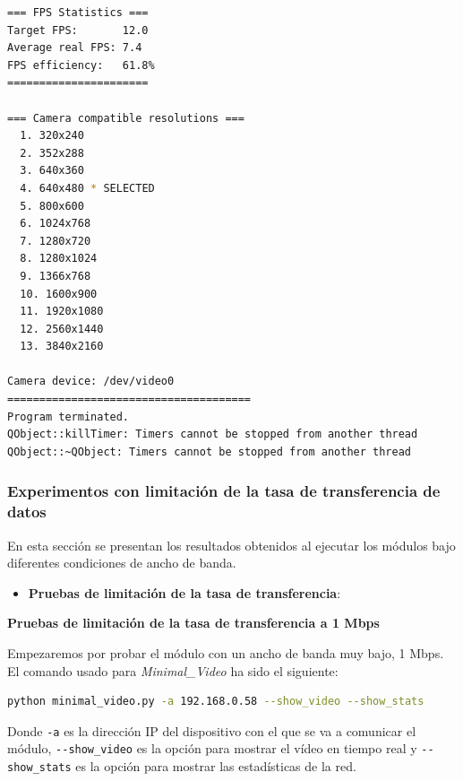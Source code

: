 \begin{lstlisting}[language=bash,basicstyle=\ttfamily\scriptsize]
=== FPS Statistics ===
Target FPS:       12.0
Average real FPS: 7.4
FPS efficiency:   61.8%
======================

=== Camera compatible resolutions ===
  1. 320x240
  2. 352x288
  3. 640x360
  4. 640x480 * SELECTED
  5. 800x600
  6. 1024x768
  7. 1280x720
  8. 1280x1024
  9. 1366x768
  10. 1600x900
  11. 1920x1080
  12. 2560x1440
  13. 3840x2160

Camera device: /dev/video0
======================================
Program terminated.
QObject::killTimer: Timers cannot be stopped from another thread
QObject::~QObject: Timers cannot be stopped from another thread
\end{lstlisting}
\vspace{\baselineskip}

\newpage

\subsubsection{Experimentos con limitación de la tasa de transferencia de datos}

En esta sección se presentan los resultados obtenidos al ejecutar los módulos bajo diferentes condiciones de ancho de banda. 
\vspace{\baselineskip}

\begin{itemize}
    \item \textbf{Pruebas de limitación de la tasa de transferencia}:
\end{itemize}

\textbf{Pruebas de limitación de la tasa de transferencia a 1 Mbps}
\vspace{\baselineskip}

Empezaremos por probar el módulo con un ancho de banda muy bajo, 1 Mbps. El comando usado para \textit{Minimal\_Video} ha sido el siguiente:

\begin{lstlisting}[language=bash]
python minimal_video.py -a 192.168.0.58 --show_video --show_stats
\end{lstlisting}
Donde \verb|-a| es la dirección IP del dispositivo con el que se va a comunicar el módulo, \verb|--show_video| es la opción para mostrar el vídeo en tiempo real y \verb|--show_stats| es la opción para mostrar las estadísticas de la red.
\vspace{\baselineskip}

